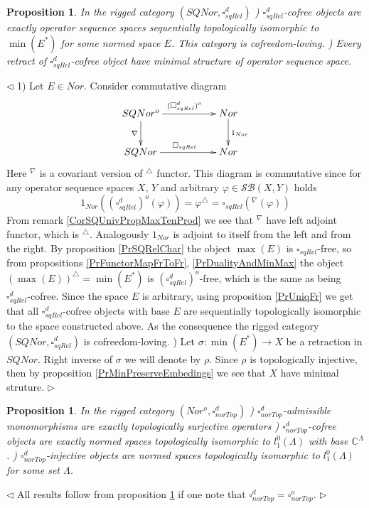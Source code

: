 \documentclass[12pt]{article}
\newtheorem{proposition}[theorem]{Proposition}
\newenvironment{proof}{\par $\triangleleft$}{$\triangleright$}
\begin{document}
\begin{proposition}\label{PrSQReldChar}
In the rigged category $(SQNor,\square_{sqRel}^d)$
) $\square_{sqRel}^d$-cofree objects are exactly operator sequence spaces sequentially topologically isomorphic to $\min(E^*)$ for some normed space $E$. This category is cofreedom-loving. 
) Every retract of $\square_{sqRel}^d$-cofree object have minimal structure of operator sequence space.
\end{proposition}
\begin{proof}
1) Let $E\in Nor$. Consider commutative diagram
$$
\xymatrix{
SQNor^o \ar[d]_{\nabla } \ar[rr]^{(\square_{sqRel}^{d})^o} & & {Nor}\ar[d]^{1_{Nor}}\\
SQNor\ar[rr]^{\square_{sqRel}}&  &{Nor}}
$$
Here ${}^\nabla$ is a covariant version of ${}^\triangle$ functor.
This diagram is commutative since for any operator sequence spaces $X$, $Y$ and arbitrary $\varphi\in\mathcal{SB}(X,Y)$ holds
$$
1_{Nor}((\square_{sqRel}^d)^o(\varphi))
=\varphi^\triangle
=\square_{sqRel}({}^\nabla(\varphi))
$$
From remark \ref{CorSQUnivPropMaxTenProd} we see that ${}^\nabla$ have left adjoint functor, which is ${}^\triangle$. Analogously $1_{Nor}$ is adjoint to itself from the left and from the right. By proposition \ref{PrSQRelChar} the object $\max(E)$ is $\square_{sqRel}$-free, so from propositions \ref{PrFunctorMapFrToFr}, \ref{PrDualityAndMinMax} the object 
$(\max(E))^\triangle=\min(E^*)$ is $(\square_{sqRel}^d)^o$-free, which is the same as being $\square_{sqRel}^d$-cofree. 
Since the space $E$ is arbitrary, using proposition \ref{PrUniqFr} we get that all $\square_{sqRel}^d$-cofree objects with base $E$ are sequentially topologically isomorphic to the space constructed above. As the consequence the rigged category $(SQNor,\square_{sqRel}^d)$ is cofreedom-loving.
) Let $\sigma:\min(E^*)\to X$ be a retraction in $SQNor$. Right inverse of $\sigma$ we will denote by $\rho$. Since $\rho$ is topologically injective, then by proposition \ref{PrMinPreserveEmbedings} we see that $X$ have minimal struture.
\end{proof}

\begin{proposition}\label{PrNorTopdChar}
In the rigged category $(Nor^o, \square_{norTop}^d)$
) $\square_{norTop}^d$-admissible monomorphisms are exactly topologically surjective operators
) $\square_{norTop}^d$-cofree objects are exactly normed spaces topologically isomorphic to $l_1^0(\Lambda)$ with base $\mathbb{C}^\Lambda$.
) $\square_{norTop}^d$-injective objects are normed spaces topologically isomorphic to  $l_1^0(\Lambda)$ for some set $\Lambda$. 
\end{proposition}
\begin{proof}
All results follow from proposition \ref{PrNorTopdChar} if one note that $\square_{norTop}^d=\square_{norTop}^o$.
\end{proof}
\end{document}
